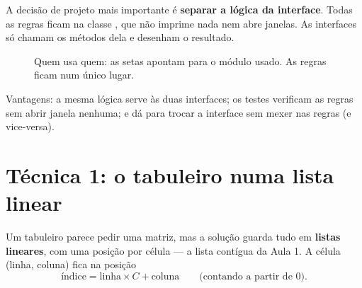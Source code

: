 A decisão de projeto mais importante é \textbf{separar a lógica da interface}. Todas as regras
ficam na classe , que não imprime nada nem abre janelas. As interfaces só
chamam os métodos dela e desenham o resultado.

\begin{figure}[!htb]
\centering
{}
\caption{Quem usa quem: as setas apontam para o módulo usado. As regras ficam num único lugar.}
\end{figure}

Vantagens: a mesma lógica serve às duas interfaces; os testes verificam as regras sem abrir
janela nenhuma; e dá para trocar a interface sem mexer nas regras (e vice-versa).

\section{Técnica 1: o tabuleiro numa lista linear}

Um tabuleiro parece pedir uma matriz, mas a solução guarda tudo em \textbf{listas lineares}, com
uma posição por célula — a lista contígua da Aula 1. A célula (linha, coluna) fica na posição
\[
\text{índice} = \text{linha} \times C + \text{coluna} \qquad \text{(contando a partir de 0)}.
\]

